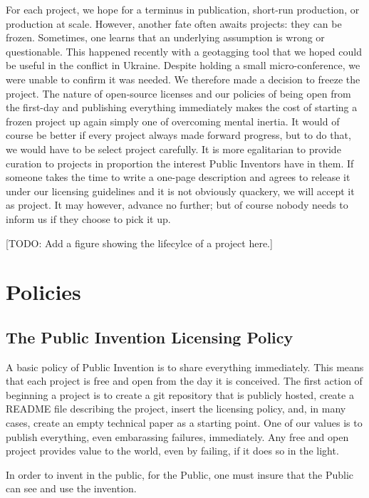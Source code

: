 \documentclass[
	fontsize=10pt, %
	twoside=false, %
	secnumdepth=1, %
]{kaobook}
\begin{document}
For each project, we hope for a terminus in publication, short-run
production, or production at scale. However, another fate often
awaits projects: they can be frozen. Sometimes, one learns
that an underlying assumption is wrong or questionable.
This happened recently with a geotagging tool that we hoped could
be useful in the conflict in Ukraine. Despite holding a small
micro-conference, we were unable to confirm it was needed.
We therefore made a decision to freeze the project.
The nature of open-source licenses and our policies of being
open from the first-day and publishing everything immediately
makes the cost of starting a frozen project up again simply one of
overcoming mental inertia.
It would of course be better if every project always made
forward progress, but to do that, we would have to be
select project carefully.
It is more egalitarian to provide curation to projects in
proportion the interest Public Inventors have in them.
If someone takes the time to write a one-page description and agrees
to release it under our licensing guidelines and it is not obviously
quackery, we will accept it as project.
It may however, advance no further; but of course nobody needs
to inform us if they choose to pick it up.

[TODO: Add a figure showing the lifecylce of a project here.]

\chapter{Policies}

\section{The Public Invention Licensing Policy}

A basic policy of Public Invention is to share everything immediately.
This means that each project is free and open from the day it is conceived.
The first action of beginning a project is to create a git repository that
is publicly hosted, create a README file describing the project,
insert the licensing policy, and, in many cases, create an empty
technical paper as a starting point.
One of our values is to publish everything, even embarassing failures,
immediately.
Any free and open project provides value to the world, even by failing,
if it does so in the light.

In order to invent in the public, for the Public, one must
insure that the Public can see and use the invention.
\end{document}
